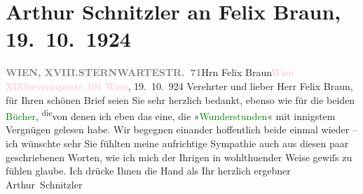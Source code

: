 

               \section[Arthur Schnitzler an Felix Braun, 19. 10. 1924]{ Arthur Schnitzler an Felix Braun, 19. 10. 1924}\nopagebreak{}\rehead{ }\normalsize\beginnumbering{} \toendnotes[C]{\smallbreak\pagebreak[2]} 
\toendnotes[C]{\smallbreak}\pstart{}{\pb}\label{T_L02416-1v}\label{T_L02416-1h}\pend{}\pstart{}\textcolor{pink}{\textcolor{gray}{\textbf{WIEN, XVIII.}}}{}\ledrightnote{\textcolor{pink}{XVIII., Währing}}\pend{}\pstart{}\textcolor{pink}{\textcolor{gray}{\textbf{STERNWARTESTR. 71}}}{}\ledrightnote{\textcolor{pink}{Sternwartestraße}}\pend{}{\bigskip}\pstart{}Hrn Felix Braun\pend{}\pstart{}\textcolor{pink}{Wien XIX}{}\ledrightnote{\textcolor{pink}{XIX., Döbling}}\pend{}\pstart{}\textcolor{pink}{Sieveringerstr 191}{}\ledrightnote{\textcolor{pink}{Sieveringer Straße}}\pend{}{\bigskip}\pstart
           \raggedleft{}{\pb}\textcolor{pink}{Wien}{}\ledrightnote{\textcolor{pink}{Wien}}, 19. 10. 924\pend
           \pstart
           Verehrter und lieber Herr Felix Braun,  für Ihren schönen Brief
                    seien Sie sehr herzlich bedankt, ebenso wie für die beiden \textcolor{green}{Bücher}{}, \substVorne{}\textsuperscript{die}\substDazwischen{}von denen\substHinten{} ich eben das eine, die »\textcolor{green}{Wunderstunden}{}\ledrightnote{\textcolor{green}{Wunderstunden. Drei Erzählungen}}« mit innigstem Vergnügen gelesen habe. Wir begegnen einander
                    hoffentlich beide einmal wieder – ich wünschte sehr Sie fühlten meine
                    aufrichtige Sympathie auch aus diesen paar geschrie{\pb}benen Worten, wie ich mich der
                    Ihrigen in wohlthuender Weise gewiſs zu fühlen glaube. Ich drücke Ihnen die
                    Hand als Ihr herzlich ergebner\pend
           \pstart \spacefill\mbox{Arthur Schnitzler}\pend{}\endnumbering{}  
      